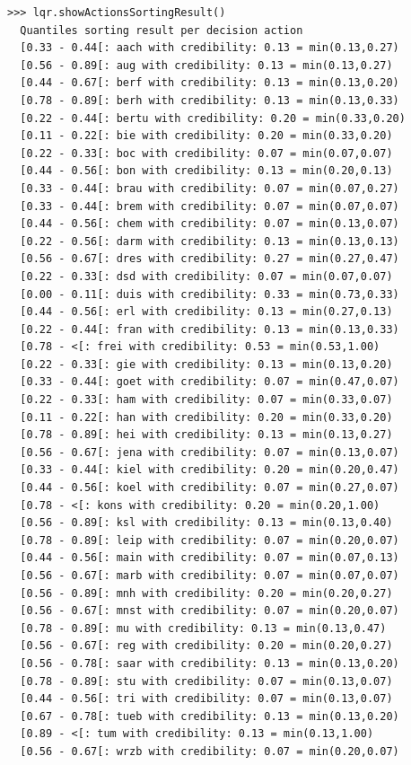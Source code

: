 \begin{lstlisting}[caption={Enumerating chordless outranking circuits},label=list:14.6,basicstyle=\scriptsize]
>>> lqr.showActionsSortingResult()
  Quantiles sorting result per decision action
  [0.33 - 0.44[: aach with credibility: 0.13 = min(0.13,0.27)
  [0.56 - 0.89[: aug with credibility: 0.13 = min(0.13,0.27)
  [0.44 - 0.67[: berf with credibility: 0.13 = min(0.13,0.20)
  [0.78 - 0.89[: berh with credibility: 0.13 = min(0.13,0.33)
  [0.22 - 0.44[: bertu with credibility: 0.20 = min(0.33,0.20)
  [0.11 - 0.22[: bie with credibility: 0.20 = min(0.33,0.20)
  [0.22 - 0.33[: boc with credibility: 0.07 = min(0.07,0.07)
  [0.44 - 0.56[: bon with credibility: 0.13 = min(0.20,0.13)
  [0.33 - 0.44[: brau with credibility: 0.07 = min(0.07,0.27)
  [0.33 - 0.44[: brem with credibility: 0.07 = min(0.07,0.07)
  [0.44 - 0.56[: chem with credibility: 0.07 = min(0.13,0.07)
  [0.22 - 0.56[: darm with credibility: 0.13 = min(0.13,0.13)
  [0.56 - 0.67[: dres with credibility: 0.27 = min(0.27,0.47)
  [0.22 - 0.33[: dsd with credibility: 0.07 = min(0.07,0.07)
  [0.00 - 0.11[: duis with credibility: 0.33 = min(0.73,0.33)
  [0.44 - 0.56[: erl with credibility: 0.13 = min(0.27,0.13)
  [0.22 - 0.44[: fran with credibility: 0.13 = min(0.13,0.33)
  [0.78 - <[: frei with credibility: 0.53 = min(0.53,1.00)
  [0.22 - 0.33[: gie with credibility: 0.13 = min(0.13,0.20)
  [0.33 - 0.44[: goet with credibility: 0.07 = min(0.47,0.07)
  [0.22 - 0.33[: ham with credibility: 0.07 = min(0.33,0.07)
  [0.11 - 0.22[: han with credibility: 0.20 = min(0.33,0.20)
  [0.78 - 0.89[: hei with credibility: 0.13 = min(0.13,0.27)
  [0.56 - 0.67[: jena with credibility: 0.07 = min(0.13,0.07)
  [0.33 - 0.44[: kiel with credibility: 0.20 = min(0.20,0.47)
  [0.44 - 0.56[: koel with credibility: 0.07 = min(0.27,0.07)
  [0.78 - <[: kons with credibility: 0.20 = min(0.20,1.00)
  [0.56 - 0.89[: ksl with credibility: 0.13 = min(0.13,0.40)
  [0.78 - 0.89[: leip with credibility: 0.07 = min(0.20,0.07)
  [0.44 - 0.56[: main with credibility: 0.07 = min(0.07,0.13)
  [0.56 - 0.67[: marb with credibility: 0.07 = min(0.07,0.07)
  [0.56 - 0.89[: mnh with credibility: 0.20 = min(0.20,0.27)
  [0.56 - 0.67[: mnst with credibility: 0.07 = min(0.20,0.07)
  [0.78 - 0.89[: mu with credibility: 0.13 = min(0.13,0.47)
  [0.56 - 0.67[: reg with credibility: 0.20 = min(0.20,0.27)
  [0.56 - 0.78[: saar with credibility: 0.13 = min(0.13,0.20)
  [0.78 - 0.89[: stu with credibility: 0.07 = min(0.13,0.07)
  [0.44 - 0.56[: tri with credibility: 0.07 = min(0.13,0.07)
  [0.67 - 0.78[: tueb with credibility: 0.13 = min(0.13,0.20)
  [0.89 - <[: tum with credibility: 0.13 = min(0.13,1.00)
  [0.56 - 0.67[: wrzb with credibility: 0.07 = min(0.20,0.07)
\end{lstlisting}

